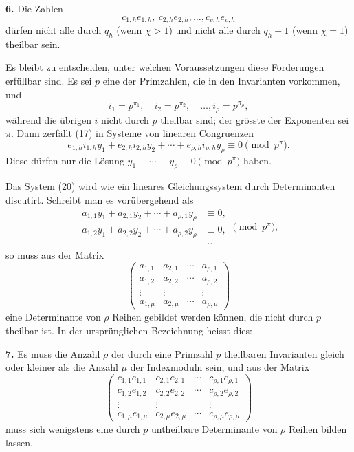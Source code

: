 \documentclass[11pt]{article}
\begin{document}
\medskip
\noindent\textbf{6.} Die Zahlen
\[
 c_{1,h}e_{1,h},\ c_{2,h}e_{2,h},
\ldots,c_{v,h}e_{v,h}
\]
dürfen nicht alle durch $q_h$ (wenn $\chi>1$) und nicht alle durch $q_h-1$ (wenn $\chi=1$) theilbar sein.

Es bleibt zu entscheiden, unter welchen Voraussetzungen diese Forderungen erfüllbar sind. Es sei $p$ eine der Primzahlen, die in den Invarianten vorkommen, und
\begin{equation}
 i_1=p^{\pi_1},\quad i_2=p^{\pi_2},\quad\ldots,
 i_\rho=p^{\pi_\rho},
\tag{18}
\end{equation}
während die übrigen $i$ nicht durch $p$ theilbar sind; der grösste der Exponenten sei $\pi$. Dann zerfällt (17) in Systeme von linearen Congruenzen
\begin{equation}
 e_{1,h}i_{1,h}y_1+e_{2,h}i_{2,h}y_2+
\cdots+e_{\rho,h}i_{\rho,h}y_\rho\equiv0\pmod {p^\pi}.
\tag{20}
\end{equation}
Diese dürfen nur die Lösung $y_1\equiv\cdots\equiv y_\rho\equiv0\pmod {p^\pi}$ haben.

Das System (20) wird wie ein lineares Gleichungssystem durch Determinanten discutirt. Schreibt man es vorübergehend als
\begin{equation}
\begin{aligned}
 a_{1,1}y_1+a_{2,1}y_2+\cdots+a_{\rho,1}y_\rho&\equiv0,\\
 a_{1,2}y_1+a_{2,2}y_2+\cdots+a_{\rho,2}y_\rho&\equiv0,\\
 &\cdots
\end{aligned}
\pmod {p^\pi},
\tag{21}
\end{equation}
so muss aus der Matrix
\begin{equation}
\begin{pmatrix}
 a_{1,1}&a_{2,1}&\cdots&a_{\rho,1}\\
 a_{1,2}&a_{2,2}&\cdots&a_{\rho,2}\\
 \vdots&\vdots&&\vdots\\
 a_{1,\mu}&a_{2,\mu}&\cdots&a_{\rho,\mu}
\end{pmatrix}
\tag{22}
\end{equation}
eine Determinante von $\rho$ Reihen gebildet werden können, die nicht durch $p$ theilbar ist. In der ursprünglichen Bezeichnung heisst dies:

\medskip
\noindent\textbf{7.} Es muss die Anzahl $\rho$ der durch eine Primzahl $p$ theilbaren Invarianten gleich oder kleiner als die Anzahl $\mu$ der Indexmoduln sein, und aus der Matrix
\begin{equation}
\begin{pmatrix}
 c_{1,1}e_{1,1}&c_{2,1}e_{2,1}&\cdots&c_{\rho,1}e_{\rho,1}\\
 c_{1,2}e_{1,2}&c_{2,2}e_{2,2}&\cdots&c_{\rho,2}e_{\rho,2}\\
 \vdots&\vdots&&\vdots\\
 c_{1,\mu}e_{1,\mu}&c_{2,\mu}e_{2,\mu}&\cdots&c_{\rho,\mu}e_{\rho,\mu}
\end{pmatrix}
\tag{24}
\end{equation}
muss sich wenigstens eine durch $p$ untheilbare Determinante von $\rho$ Reihen bilden lassen.
\end{document}
